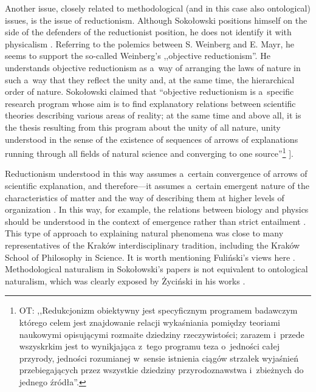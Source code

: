 Another issue, closely related to methodological (and in this case also ontological) issues, is the issue of reductionism. Although Sokołowski positions himself on the side of the defenders of the reductionist position, he does not identify it with physicalism 
\parencite[][]{}. %
 Referring to the polemics between S. Weinberg and E. Mayr, he seems to support the so-called Weinberg's ,,objective reductionism''. He understands objective reductionism as a~way of arranging the laws of nature in such a~way that they reflect the unity and, at the same time, the hierarchical order of nature. Sokołowski claimed that ``objective reductionism is a~specific research program whose aim is to find explanatory relations between scientific theories describing various areas of reality; at the same time and above all, it is the thesis resulting from this program about the unity of all nature, unity understood in the sense of the existence of sequences of arrows of explanations running through all fields of natural science and converging to one source''\footnote{OT: ,,Redukcjonizm obiektywny jest specyficznym programem badawczym którego celem jest znajdowanie relacji wykaśniania pomiędzy teoriami naukowymi opisującymi rozmaite dziedziny rzeczywistości; zarazem i~przede wszyskrkim jest to wynikjająca z~tego programu teza o~jedności całej przyrody, jedności rozumianej w~sensie istnienia ciągów strzałek wyjaśnień przebiegających przez wszystkie dziedziny przyrodoznawstwa i~zbieżnych do jednego źródła''.} 
\parencite[][p.75]{}%
].



Reductionism understood in this way assumes a~certain convergence of arrows of scientific explanation, and therefore---it assumes a~certain emergent nature of the characteristics of matter and the way of describing them at higher levels of organization 
\parencite[see][]{}. %
 In this way, for example, the relations between biology and physics should be understood in the context of emergence rather than strict entailment 
\parencite[][p.216]{}. %
 This type of approach to explaining natural phenomena was close to many representatives of the Kraków interdisciplinary tradition, including the Kraków School of Philosophy in Science. It is worth mentioning Fuliński's views here 
\parencite[e.g.,][]{}. %
 Methodological naturalism in Sokołowski's papers is not equivalent to ontological naturalism, which was clearly exposed by Życiński in his works 
\parencite[][]{}.%




